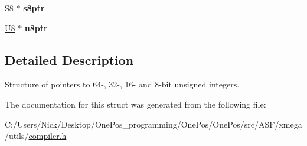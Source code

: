 \begin{DoxyCompactItemize}
\item 
\hypertarget{struct_struct_ptr_a95089abbb09b37f10838becaf891460c}{\hyperlink{group__group__xmega__utils_gaf1475a0bb1962ef08dd1f78bd5dba87a}{S8} $\ast$ {\bfseries s8ptr}}\label{struct_struct_ptr_a95089abbb09b37f10838becaf891460c}

\item 
\hypertarget{struct_struct_ptr_a9727d8b94598f408a3631893ed44f273}{\hyperlink{group__group__xmega__utils_gaa63ef7b996d5487ce35a5a66601f3e73}{U8} $\ast$ {\bfseries u8ptr}}\label{struct_struct_ptr_a9727d8b94598f408a3631893ed44f273}

\end{DoxyCompactItemize}


\subsection{Detailed Description}
Structure of pointers to 64-\/, 32-\/, 16-\/ and 8-\/bit unsigned integers. 

The documentation for this struct was generated from the following file\-:\begin{DoxyCompactItemize}
\item 
C\-:/\-Users/\-Nick/\-Desktop/\-One\-Pos\-\_\-programming/\-One\-Pos/\-One\-Pos/src/\-A\-S\-F/xmega/utils/\hyperlink{compiler_8h}{compiler.\-h}\end{DoxyCompactItemize}

